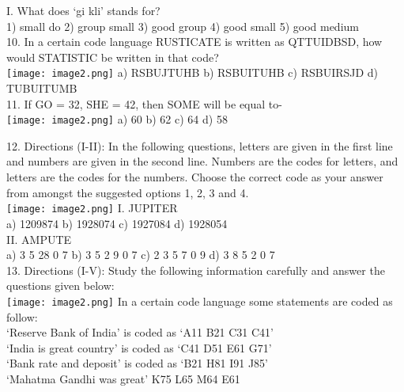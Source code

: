 \documentclass[
]{article}
\begin{document}
I. What does ‘gi kli’ stands for?\\
1) small do \hspace{1mm} 2) group small \hspace{1mm} 3) good group \hspace{1mm} 4) good small \hspace{1mm} 5) good medium\\

10. In a certain code language RUSTICATE is written as QTTUIDBSD, how would STATISTIC be written in that code?\\
\texttt{[image: image2.png]}
a) RSBUJTUHB \hspace{1mm} b) RSBUITUHB \hspace{1mm} c) RSBUIRSJD \hspace{1mm} d) TUBUITUMB\\

11. If GO = 32, SHE = 42, then SOME will be equal to-\\
\texttt{[image: image2.png]}
a) 60 \hspace{1mm} b) 62 \hspace{1mm} c) 64 \hspace{1mm} d) 58

12. Directions (I-II): In the following questions, letters are given in the first line and numbers are given in the second line. Numbers are the codes for letters, and letters are the codes for the numbers. Choose the correct code as your answer from amongst the suggested options 1, 2, 3 and 4.\\
\texttt{[image: image2.png]}
I. JUPITER\\
a) 1209874 \hspace{1mm} b) 1928074 \hspace{1mm} c) 1927084 \hspace{1mm} d) 1928054\\

II. AMPUTE\\
a) 3 5 28 0 7 \hspace{1mm} b) 3 5 2 9 0 7 \hspace{1mm} c) 2 3 5 7 0 9 \hspace{1mm} d) 3 8 5 2 0 7\\

13. Directions (I-V): Study the following information carefully and answer the questions given below:\\
\texttt{[image: image2.png]}
In a certain code language some statements are coded as follow:\\
‘Reserve Bank of India’ is coded as ‘A11 B21 C31 C41’\\
‘India is great country’ is coded as ‘C41 D51 E61 G71’\\
‘Bank rate and deposit’ is coded as ‘B21 H81 I91 J85’\\
‘Mahatma Gandhi was great’ K75 L65 M64 E61\\
\end{document}
